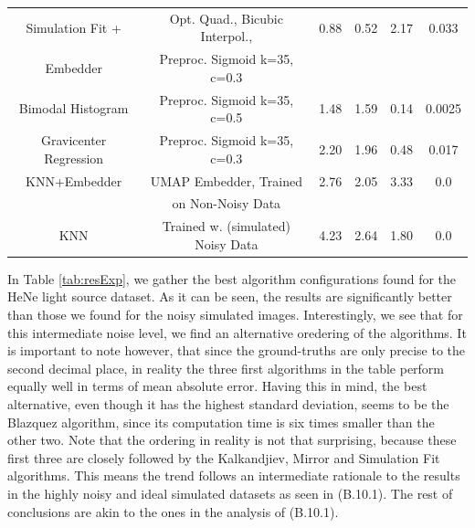 \documentclass[11pt, a4paper, twoside]{article} %
\begin{document}
\begin{table}[h!]
\begin{tabular}{c|c|cc|cc}
       Simulation Fit + &    {\small     Opt. Quad., Bicubic Interpol.}, &  0.88 & 0.52 &  2.17 &  0.033 \\
   Embedder                    &      {\small     Preproc. Sigmoid k=35, c=0.3 }&          &         &          &          \\ \hline\rule{0pt}{4mm}{}                     
                       
     Bimodal Histogram &       {\small    Preproc. Sigmoid k=35, c=0.5 }&  1.48 & 1.59 &  0.14 &  0.0025 \\ \hline\rule{0pt}{4mm}{}
Gravicenter Regression &         {\small  Preproc. Sigmoid k=35, c=0.3 } &  2.20 & 1.96 &  0.48 &  0.017 \\ \hline\rule{0pt}{4mm}{}
          KNN+Embedder &                {\small UMAP Embedder, Trained } &  2.76 & 2.05 &  3.33 &  0.0 \\
                       &                      {\small on Non-Noisy Data} &          &         &          &          \\ \hline\rule{0pt}{4mm}{}
                   KNN &    {\small  Trained w. (simulated) Noisy Data }&  4.23 & 2.64 &  1.80 &  0.0 \\
\bottomrule
\end{tabular}

\end{table}
\vspace{0.07cm}
In Table \ref{tab:resExp}, we gather the best algorithm configurations found for the HeNe light source dataset. As it can be seen, the results are significantly better than those we found for the noisy simulated images. Interestingly, we see that for this intermediate noise level, we find an alternative oredering of the algorithms. It is important to note however, that since the ground-truths are only precise to the second decimal place, in reality the three first algorithms in the table perform equally well in terms of mean absolute error. Having this in mind, the best alternative, even though it has the highest standard deviation, seems to be the Blazquez algorithm, since its computation time is six times smaller than the other two. Note that the ordering in reality is not that surprising, because these first three are closely followed by the Kalkandjiev, Mirror and Simulation Fit algorithms. This means the trend follows an intermediate rationale to the results in the highly noisy and ideal simulated datasets as seen in (B.10.1). The rest of conclusions are akin to the ones in the analysis of (B.10.1).\vspace{-0.06cm}
\end{document}

